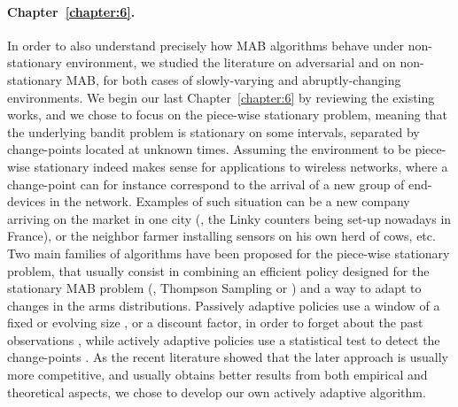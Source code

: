 \paragraph{Chapter~\ref{chapter:6}.}
%
In order to also understand precisely how MAB algorithms behave under non-stationary environment, we studied the literature on adversarial and on non-stationary MAB, for both cases of slowly-varying and abruptly-changing environments.
We begin our last Chapter~\ref{chapter:6} by reviewing the existing works,
and we chose to focus on the piece-wise stationary problem,
meaning that the underlying bandit problem is stationary on some intervals, separated by change-points located at unknown times.
Assuming the environment to be piece-wise stationary indeed makes sense for applications to wireless networks, where a change-point can for instance correspond to the arrival of a new group of end-devices in the network. Examples of such situation can be a new company arriving on the market in one city (\eg, the Linky counters being set-up nowadays in France), or the neighbor farmer installing sensors on his own herd of cows, etc.
%
Two main families of algorithms have been proposed for the piece-wise stationary problem,
that usually consist in combining an efficient policy designed for the stationary MAB problem (\eg, Thompson Sampling or \klUCB) and a way to adapt to changes in the arms distributions.
Passively adaptive policies use a window of a fixed or evolving size \cite{Garivier11UCBDiscount}, or a discount factor, in order to forget about the past observations \cite{Kocsis06,Gupta11thompson},
while actively adaptive policies use a statistical test to detect the change-points \cite{MellorShapiro13,Allesiardo15}.
%
As the recent literature showed that the later approach is usually more competitive, and usually obtains better results from both empirical and theoretical aspects, we chose to develop our own actively adaptive algorithm.

